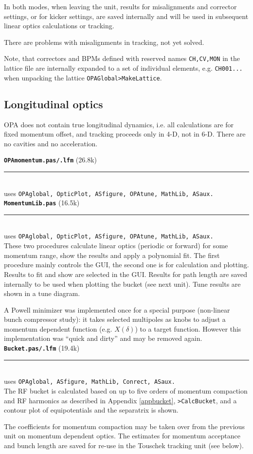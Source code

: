 \documentclass[12pt]{article}
\newcommand\code[1]{{\tt #1}}
\newcommand{\todo}[1]{{\color{red} #1}}
\newcommand\opamodule[3]{{\bf \tt #1} #2\\  \rule[3pt]{\textwidth}{0.2pt} \\ {\scriptsize uses \tt  #3}\\[1ex]}
\begin{document}
In both modes, when leaving the unit, results for misalignments and corrector settings, or for kicker settings, are saved internally and will be used in subsequent linear optics calculations or tracking.

\todo{There are problems with misalignments in tracking, not yet solved.}

Note, that correctors and BPMs defined with reserved names {\tt CH,CV,MON} in the lattice file are internally expanded to a set of individual elements, e.g. {\tt CH001...} when unpacking the lattice \code{OPAGlobal>MakeLattice}.

\subsection{Longitudinal optics}
OPA does not contain true longitudinal dynamics, i.e. all calculations are for fixed momentum offset, and tracking proceeds only in 4-D, not in 6-D. There are no cavities and no acceleration.

\opamodule{OPAmomentum.pas/.lfm}{(26.8k)}{OPAglobal, OpticPlot, ASfigure, OPAtune, MathLib, ASaux.}
\opamodule{MomentumLib.pas}{(16.5k)}{OPAglobal, OpticPlot, ASfigure, OPAtune, MathLib, ASaux.}
These two procedures calculate linear optics (periodic or forward) for some momentum range, show the results and apply a polynomial fit. The first procedure mainly controls the GUI, the second one is for calculation and plotting.
Results to fit and show are selected in the GUI. Results for path length are saved internally to be used when plotting the bucket (see next unit). Tune results are shown in a tune diagram.

\todo{A Powell minimizer was implemented once for a special purpose (non-linear bunch compressor study): it takes selected multipoles as knobs to adjust a momentum dependent function (e.g. $X(\delta)$) to a target function. However this implementation was ``quick and dirty'' and may be removed again.}\\


\opamodule{Bucket.pas/.lfm}{(19.4k)}{OPAglobal, ASfigure, MathLib, Conrect, ASaux.}
The RF bucket is calculated based on up to five orders of momentum compaction and RF harmonics as described in Appendix \ref{appbucket}, \code{>CalcBucket}, and a contour plot of equipotentials and the separatrix is shown.

The coefficients for momentum compaction may be taken over from the previous unit on momentum dependent optics. The estimates for momentum acceptance and bunch length are saved for re-use in the Touschek tracking unit (see below).\\
\end{document}
